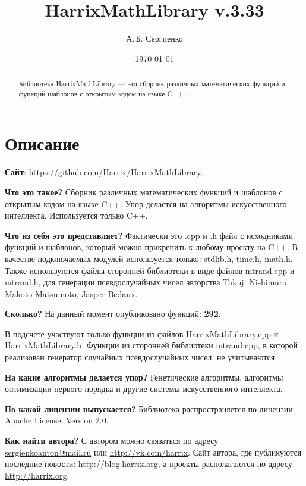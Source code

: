 \documentclass[a4paper,12pt]{article}
\title{HarrixMathLibrary v.3.33}
\author{А.\,Б. Сергиенко}
\date{\today}
\begin{document}


\maketitle

\begin{abstract}
Библиотека HarrixMathLibrary --- это сборник различных математических функций и функций-шаблонов с открытым кодом на языке C++.
\end{abstract}

\tableofcontents

\newpage

\section{Описание}

\textbf{Сайт}: \href{https://github.com/Harrix/HarrixMathLibrary}{https://github.com/Harrix/HarrixMathLibrary}.

\textbf{Что это такое?} Сборник различных математических функций и шаблонов с открытым кодом на языке C++. Упор делается на алгоритмы искусственного интеллекта. Используется только C++.

\textbf{Что из себя это представляет?} Фактически это .cpp и .h файл с исходниками функций и шаблонов, который можно прикрепить к любому проекту на C++. В качестве подключаемых модулей используется только: stdlib.h, time.h, math.h. Также используются файлы сторонней библиотеки в виде файлов mtrand.cpp и mtrand.h, для генерации псевдослучайных чисел авторства Takuji Nishimura, Makoto Matsumoto, Jasper Bedaux.

\textbf{Сколько?} На данный момент опубликовано функций: \textbf{292}.

В подсчете участвуют только функции из файлов HarrixMathLibrary.cpp и HarrixMathLibrary.h. Функции из сторонней библиотеки mtrand.cpp, в которой реализован генератор случайных псевдослучайных чисел, не учитываются.

\textbf{На какие алгоритмы делается упор?} Генетические алгоритмы, алгоритмы оптимизации первого порядка и другие системы искусственного интеллекта.

\textbf{По какой лицензии выпускается?} Библиотека распространяется по лицензии Apache License, Version 2.0.

\textbf{Как найти автора?} С автором можно связаться по адресу \href {mailto:sergienkoanton@mail.ru} {sergienkoanton@mail.ru} или  \href {http://vk.com/harrix} {http://vk.com/harrix}. Сайт автора, где публикуются последние новости: \href {http://blog.harrix.org} {http://blog.harrix.org}, а проекты располагаются по адресу \href {http://harrix.org} {http://harrix.org}.
\end{document}
